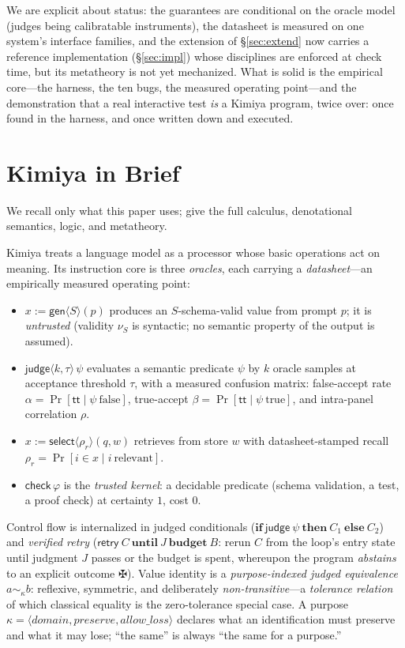 \documentclass[acmsmall,screen,nonacm]{acmart}
\newcommand{\semeqk}[1]{\mathrel{\sim_{#1}}}
\newcommand{\gen}{\mathsf{gen}}
\newcommand{\checkk}{\mathsf{check}}
\newcommand{\judge}{\mathsf{judge}}
\newcommand{\retry}{\mathsf{retry}}
\newcommand{\select}{\mathsf{select}}
\newcommand{\ctx}{\kappa}
\newcommand{\true}{\mathsf{tt}}
\newcommand{\Prob}{\Pr}
\newcommand{\bolt}{\maltese}
\theoremstyle{acmdefinition}%
\theoremstyle{acmplain}%
\begin{document}
We are explicit about status: the guarantees are conditional on the
oracle model (judges being calibratable instruments), the datasheet is
measured on one system's interface families, and the extension of
\S\ref{sec:extend} now carries a reference implementation
(\S\ref{sec:impl}) whose disciplines are enforced at check time, but
its metatheory is not yet mechanized. What is
solid is the empirical core---the harness, the ten bugs, the measured
operating point---and the demonstration that a real interactive test
\emph{is} a Kimiya program, twice over: once found in the harness, and
once written down and executed.

\section{Kimiya in Brief}
\label{sec:background}

We recall only what this paper uses; \citet{kimiya} give the full
calculus, denotational semantics, logic, and metatheory.

Kimiya treats a language model as a processor whose basic operations act
on meaning. Its instruction core is three \emph{oracles}, each carrying a
\emph{datasheet}---an empirically measured operating point:
\begin{itemize}
\item $x := \gen\langle S\rangle(p)$ produces an $S$-schema-valid value
from prompt $p$; it is \emph{untrusted} (validity $\nu_S$ is syntactic;
no semantic property of the output is assumed).
\item $\judge\langle k,\tau\rangle\,\psi$ evaluates a semantic predicate
$\psi$ by $k$ oracle samples at acceptance threshold $\tau$, with a
measured confusion matrix: false-accept rate $\alpha=\Prob[\true\mid\psi\
\text{false}]$, true-accept $\beta=\Prob[\true\mid\psi\ \text{true}]$,
and intra-panel correlation $\rho$.
\item $x := \select\langle\rho_r\rangle(q,w)$ retrieves from store $w$
with datasheet-stamped recall $\rho_r=\Prob[i\in x\mid i\ \text{relevant}]$.
\item $\checkk\,\varphi$ is the \emph{trusted kernel}: a decidable
predicate (schema validation, a test, a proof check) at certainty $1$,
cost $0$.
\end{itemize}
Control flow is internalized in judged conditionals ($\mathbf{if}\
\judge\ \psi\ \mathbf{then}\ C_1\ \mathbf{else}\ C_2$) and \emph{verified
retry} ($\retry\ C\ \mathbf{until}\ J\ \mathbf{budget}\ B$: rerun $C$ from
the loop's entry state until judgment $J$ passes or the budget is spent,
whereupon the program \emph{abstains} to an explicit outcome $\bolt$).
Value identity is a \emph{purpose-indexed judged equivalence}
$a\semeqk{\ctx}b$: reflexive, symmetric, and deliberately
\emph{non-transitive}---a \emph{tolerance relation} of which classical
equality is the zero-tolerance special case. A purpose
$\ctx=\langle\mathit{domain},\mathit{preserve},\mathit{allow\_loss}\rangle$
declares what an identification must preserve and what it may lose;
``the same'' is always ``the same for a purpose.''
\end{document}
